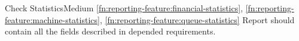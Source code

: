 	\begin{functional}{Check Statistics}{Medium}
		{
			\ref{fn:reporting-feature:financial-statistics},
			\ref{fn:reporting-feature:machine-statistics},
			\ref{fn:reporting-feature:queue-statistics}
		}
		\label{fn:reporting-feature:check-statistics}
		{
			Report should contain all the fields described in depended requirements.
		}
	\end{functional}